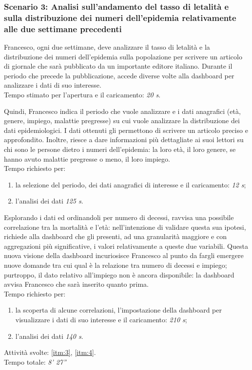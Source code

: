 \subsubsection*{Scenario 3: Analisi sull'andamento del tasso di letalità e sulla distribuzione dei numeri dell'epidemia relativamente alle due settimane precedenti}
Francesco, ogni due settimane, deve analizzare il tasso di letalità e la distribuzione dei numeri dell’epidemia sulla popolazione per scrivere un articolo di giornale che sarà pubblicato da un importante editore italiano. Durante il periodo che precede la pubblicazione, accede diverse volte alla dashboard per analizzare i dati di suo interesse.\\
Tempo stimato per l'apertura e il caricamento: \textit{20 s}. 

Quindi, Francesco indica il periodo che vuole analizzare e i dati anagrafici (età, genere, impiego, malattie pregresse) su cui vuole analizzare la distribuzione dei dati epidemiologici.
I dati ottenuti gli permettono di scrivere un articolo preciso e approfondito. Inoltre, riesce a dare informazioni più dettagliate ai suoi lettori su chi sono le persone dietro i numeri dell'epidemia: la loro età, il loro genere, se hanno avuto malattie pregresse o meno, il loro impiego.\\
Tempo richiesto per:
\begin{enumerate}
    \item la selezione del periodo, dei dati anagrafici di interesse e il caricamento: \textit{12 s};
    \item l'analisi dei dati \textit{125 s}.
\end{enumerate}

Esplorando i dati ed ordinandoli per numero di decessi, ravvisa una possibile correlazione tra la mortalità e l'età: nell'intenzione di validare questa sua ipotesi, richiede alla dashboard che gli presenti, ad una granularità maggiore e con aggregazioni più significative, i valori relativamente a queste due variabili. 
Questa nuova visione della dashboard incuriosisce Francesco al punto da fargli emergere nuove domande tra cui qual è la relazione tra numero di decessi e impiego; purtroppo, il dato relativo all'impiego non è ancora disponibile: la dashboard avvisa Francesco che sarà inserito quanto prima.\\
Tempo richiesto per:
\begin{enumerate}
    \item la scoperta di alcune correlazioni, l'impostazione della dashboard per visualizzare i dati di suo interesse e il caricamento: \textit{210 s};
    \item l'analisi dei dati \textit{140 s}.
\end{enumerate}
\noindent
Attività svolte: \ref{itm:3}, \ref{itm:4}.\\ 
Tempo totale: \textit{8' 27''} 

